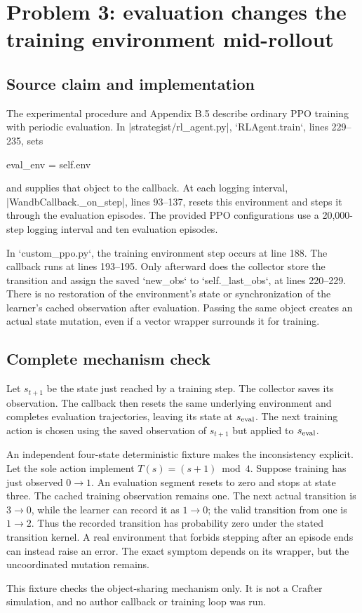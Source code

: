\documentclass[10pt]{article}
\begin{document}
\section*{Problem 3: evaluation changes the training environment mid-rollout}
\subsection*{Source claim and implementation}
The experimental procedure and Appendix B.5 describe ordinary PPO training with periodic evaluation. In |strategist/rl\_agent.py|, `RLAgent.train`, lines 229–235, sets\par
{\ttfamily\footnotesize eval\_env = self.env}\par
and supplies that object to the callback. At each logging interval, |WandbCallback.\_on\_step|, lines 93–137, resets this environment and steps it through the evaluation episodes. The provided PPO configurations use a 20,000-step logging interval and ten evaluation episodes.\par
In `custom\_ppo.py`, the training environment step occurs at line 188. The callback runs at lines 193–195. Only afterward does the collector store the transition and assign the saved `new\_obs` to `self.\_last\_obs`, at lines 220–229. There is no restoration of the environment’s state or synchronization of the learner’s cached observation after evaluation. Passing the same object creates an actual state mutation, even if a vector wrapper surrounds it for training.\par
\subsection*{Complete mechanism check}
Let \(s_{t+1}\) be the state just reached by a training step. The collector saves its observation. The callback then resets the same underlying environment and completes evaluation trajectories, leaving its state at \(s_{\rm eval}\). The next training action is chosen using the saved observation of \(s_{t+1}\) but applied to \(s_{\rm eval}\).\par
An independent four-state deterministic fixture makes the inconsistency explicit. Let the sole action implement \(T(s)=(s+1)\bmod4\). Suppose training has just observed \(0\to1\). An evaluation segment resets to zero and stops at state three. The cached training observation remains one. The next actual transition is \(3\to0\), while the learner can record it as \(1\to0\); the valid transition from one is \(1\to2\). Thus the recorded transition has probability zero under the stated transition kernel. A real environment that forbids stepping after an episode ends can instead raise an error. The exact symptom depends on its wrapper, but the uncoordinated mutation remains.\par
This fixture checks the object-sharing mechanism only. It is not a Crafter simulation, and no author callback or training loop was run.\par
\end{document}
